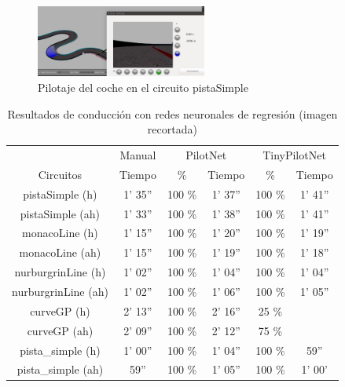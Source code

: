 \begin{figure}
\begin{center}
	\includegraphics[width=0.5\textwidth]{figures/Regresion/pilotnet_cropped.png}
   \caption{Pilotaje del coche en el circuito pistaSimple}
	\label{fig.simple_reg}
\end{center}
\end{figure}

\begin{table}[H]
\centering
\caption{Resultados de conducción con redes neuronales de regresión (imagen recortada)}
\label{resultados_regresion_recortada}
\begin{tabular}{c|c|c|c|c|c|}
\cline{2-6}
                          & \multicolumn{1}{c|}{Manual} & \multicolumn{2}{c|}{PilotNet} & \multicolumn{2}{c|}{TinyPilotNet} \\ \cline{1-6} 
                        \multicolumn{1}{|c|}{Circuitos}    & Tiempo       & \%       & Tiempo       & \%        & Tiempo         \\ \hline
\multicolumn{1}{|c|}{pistaSimple (h)}    & 1' 35''           & 100 \%         & 1' 37''       &  100 \%        & 1' 41''               \\ \hline
\multicolumn{1}{|c|}{pistaSimple (ah)}     & 1' 33''           & 100 \%          & 1' 38''           & 100 \%        & 1' 41''      \\ \hline
\multicolumn{1}{|c|}{monacoLine (h)}      & 1' 15''           & 100 \%            & 1' 20''            & 100 \%         & 1' 19''                \\ \hline
\multicolumn{1}{|c|}{monacoLine (ah)}       & 1' 15''       &  100 \%      & 1' 19''         & 100 \%          & 1' 18''         \\ \hline
\multicolumn{1}{|c|}{nurburgrinLine (h)}      & 1' 02''       &  100 \%         & 1' 04''           & 100 \%        & 1' 04''       \\ \hline
\multicolumn{1}{|c|}{nurburgrinLine (ah)}       & 1' 02''     & 100 \%         & 1' 06''          & 100 \%     & 1' 05''            \\ \hline
\multicolumn{1}{|c|}{curveGP (h)}     & 2' 13''           & 100 \%         & 2' 16''            & 25 \%        &              \\ \hline
\multicolumn{1}{|c|}{curveGP (ah)}       & 2' 09''            & 100 \%         & 2' 12''        & 75 \%        &         \\ \hline
\multicolumn{1}{|c|}{pista\_simple (h)}       & 1' 00''           & 100 \%       & 1' 04''            & 100 \%         & 59''        \\ \hline
\multicolumn{1}{|c|}{pista\_simple (ah)}     & 59''          & 100 \%       & 1' 05''         & 100 \%        & 1' 00'                 \\ \hline
\end{tabular}
\end{table}


